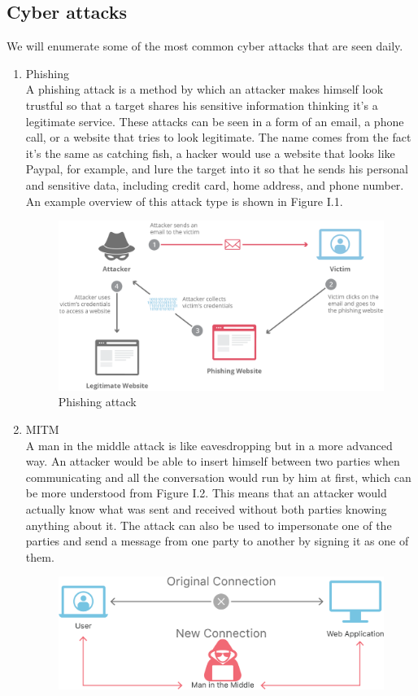 \subsection{Cyber attacks}
We will enumerate some of the most common cyber attacks that are seen daily.
\begin{enumerate}
    \item Phishing\\
    A phishing attack is a method by which an attacker makes himself look trustful so that a target shares his sensitive information thinking it's a legitimate service. These attacks can be seen in a form of an email, a phone call, or a website that tries to look legitimate. The name comes from the fact it's the same as catching fish, a hacker would use a website that looks like Paypal, for example, and lure the target into it so that he sends his personal and sensitive data, including credit card, home address, and phone number. An example overview of this attack type is shown in Figure I.1.
    \begin{figure}[H]
    \centering
    \includegraphics[width=0.7\columnwidth]{Figures/phising.png}
    \caption{Phishing attack \cite{phishing}}
    \end{figure}
    \item MITM\\
    A man in the middle attack is like eavesdropping but in a more advanced way. An attacker would be able to insert himself between two parties when communicating and all the conversation would run by him at first, which can be more understood from Figure I.2. This means that an attacker would actually know what was sent and received without both parties knowing anything about it. The attack can also be used to impersonate one of the parties and send a message from one party to another by signing it as one of them.
    \begin{figure}[H]
    \centering
    \includegraphics[width=0.7\columnwidth]{Figures/mitm.png}

\end{figure}
\end{enumerate}
